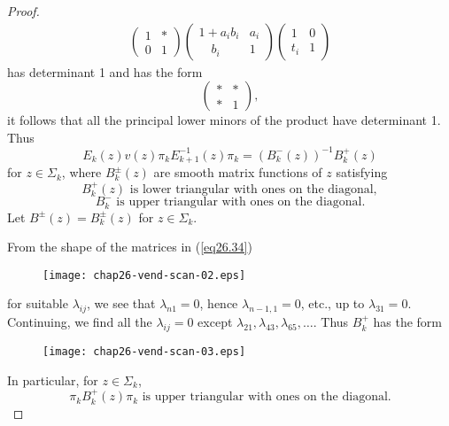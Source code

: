 \documentclass{surv-l}
\theoremstyle{plain}
\theoremstyle{definition}
\numberwithin{equation}{chapter}
\begin{document}
\begin{proof}
\begin{align*}
\left(\begin{array}{cc}
  1 & * \\
  0 & 1
\end{array}\right)\left(\begin{array}{ll}
1+a_{i}b_{i} & a_{i}\\
\quad b_{i}& 1
\end{array}\right)\left(\begin{array}{ll}
1 & 0\\
t_{i} & 1
\end{array}\right)
\end{align*}
has determinant 1 and has the form
\begin{equation*}
\left(\begin{array}{cc}
  * & * \\
  * & 1
\end{array}\right),
\end{equation*}
it follows that all the principal lower minors of the product have determinant 1.
Thus
\begin{equation}\label{eq26.34}
E_{k}(z)v(z)\pi_{k}E_{k+1}^{-1}(z)\pi_{k}=(B_{k}^{-}(z))^{-1}B_{k}^{+}(z)
\end{equation}
for $z\in\Sigma_{k}$, where $B_{k}^{\pm}(z)$ are smooth matrix functions of $z$ satisfying
\begin{equation}\label{eq26.35}
B_{k}^{+}(z)\text{ is lower triangular with ones on the diagonal},
\end{equation}
\begin{equation}\label{eq26.36}
B_{k}^{-} \text{ is upper triangular with ones on the diagonal}.
\end{equation}
Let $B^{\pm}(z)=B_{k}^{\pm}(z)$ for $z\in\Sigma_{k}$.

From the shape of the matrices in (\ref{eq26.34})\\
\begin{figure}[h]
\texttt{[image: chap26-vend-scan-02.eps]}
\end{figure}
for suitable $\lambda_{ij}$, we see that $\lambda_{n1}=0$, hence $\lambda_{n-1,1}=0$, etc., up to $\lambda_{31}=0$. Continuing, we find all the $\lambda_{ij}=0$ except $\lambda_{21}, \lambda_{43}, \lambda_{65},\ldots.$ Thus $B_{k}^{+}$ has the form
\begin{figure}[h]
\texttt{[image: chap26-vend-scan-03.eps]}
\end{figure}
In particular, for $z\in\Sigma_{k}$,
\begin{equation}\label{eq26.37}
\pi_{k}B_{k}^{+}(z)\pi_{k}\text{ is upper triangular with ones on the diagonal}.
\end{equation}


\end{proof}
\end{document}
